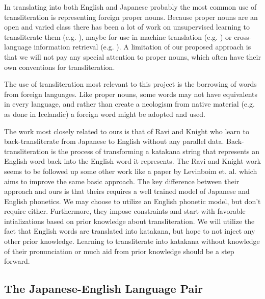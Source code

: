 \documentclass{article}
\begin{document}
In translating into both English and Japanese
probably the most common use of transliteration
is representing foreign proper nouns.
Because proper nouns are an open and varied class
there has been a lot of work on unsupervised learning to transliterate them
(e.g. \cite{Tao2006UnsupervisedNE}),
maybe for use in machine translation (e.g. \cite{Durrani2014IntegratingAU})
or cross-language information retrieval (e.g. \cite{10.1007/978-3-642-40087-2_29}).
A limitation of our proposed approach
is that we will not pay any special attention to proper nouns,
which often have their own conventions for transliteration.

The use of transliteration most relevant to this project
is the borrowing of words from foreign languages.
Like proper nouns,
some words may not have equivalents in every language,
and rather than create a neologism from native material (e.g. as done in Icelandic)
a foreign word might be adopted and used.

The work most closely related to ours is that of Ravi and Knight
\cite{Ravi2009LearningPM}
who learn to back-transliterate from Japanese to English
without any parallel data.
Back-transliteration is the process of
transforming a katakana string that represents an English word
back into the English word it represents.
The Ravi and Knight work seems to be followed up some other work
like a paper by Levinboim et. al. \cite{Levinboim2015ModelIR}
which aims to improve the same basic approach.
The key difference between their approach and ours
is that theirs requires a well trained model of Japanese and English phonetics.
We may choose to utilize an English phonetic model,
but don't require either.
Furthermore,
they impose constraints and start with favorable intializations
based on prior knowledge about transliteration.
We will utilize the fact
that English words are translated into katakana,
but hope to not inject any other prior knowledge.
Learning to transliterate into katakana
without knowledge of their pronunciation
or much aid from prior knowledge should be a step forward.

\subsection*{The Japanese-English Language Pair}
\end{document}
